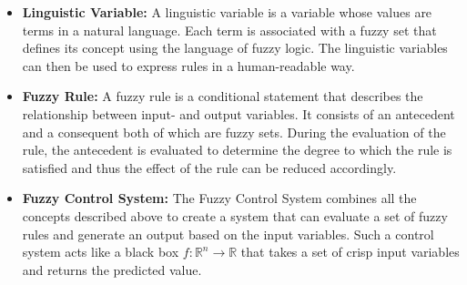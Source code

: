 \begin{itemize}
  \item \textbf{Linguistic Variable:} A linguistic variable is a variable whose values are terms in a natural language. Each term is associated with a fuzzy set that defines its concept using the language of fuzzy logic. The linguistic variables can then be used to express rules in a human-readable way.

  \item \textbf{Fuzzy Rule:} A fuzzy rule is a conditional statement that describes the relationship between input- and output variables. It consists of an antecedent and a consequent both of which are fuzzy sets. During the evaluation of the rule, the antecedent is evaluated to determine the degree to which the rule is satisfied and thus the effect of the rule can be reduced accordingly.

  \item \textbf{Fuzzy Control System:} The Fuzzy Control System combines all the concepts described above to create a system that can evaluate a set of fuzzy rules and generate an output based on the input variables. Such a control system acts like a black box $f: \mathbb{R}^n \rightarrow \mathbb{R}$ that takes a set of crisp input variables and returns the predicted value.
\end{itemize}





\newcommand{\fuzzySetNodeOneD}[4]{
  \begin{tikzpicture}
    \begin{axis}%
      [
        width=4.5cm,
        height=3cm,
        axis lines=center,
        xlabel={#1},
        x label style={at={(axis description cs:0.9,0.25)},anchor=north},
        ylabel=$\mu$,
        y label style={at={(axis description cs:0.5,1)},anchor=south},
        xmin=-6,
        xmax=6,
        ytick={},
        yticklabels={},
        extra x ticks={0},
        extra x tick labels={#3},
        ymax=1,
        samples=25,
        extra y ticks={1},
        every axis plot/.append style={thick}
      ]
      \addplot[red]  {#4};
    \end{axis}
    \node[above,font=\large\bfseries,inner sep=5pt] at (current bounding box.north) {#2};
  \end{tikzpicture}
}


